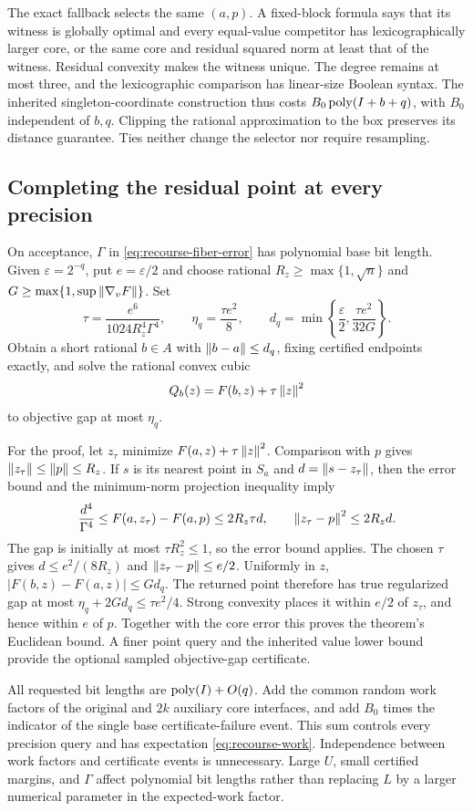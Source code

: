 The exact fallback selects the same $(a,p)$. A fixed-block formula
says that its witness is globally optimal and every equal-value
competitor has lexicographically larger core, or the same core and
residual squared norm at least that of the witness. Residual convexity
makes the witness unique. The degree remains at most three, and the
lexicographic comparison has linear-size Boolean syntax. The inherited
singleton-coordinate construction thus costs
$B_0\operatorname{poly}(I+b+q)$, with $B_0$ independent of $b,q$. Clipping the
rational approximation to the box preserves its distance guarantee.
Ties neither change the selector nor require resampling.

\subsection{Completing the residual point at every precision}

On acceptance, $\Gamma$ in \eqref{eq:recourse-fiber-error} has
polynomial base bit length. Given $\varepsilon=2^{-q}$, put
$e=\varepsilon/2$ and choose rational
$R_z\ge\max\{1,\sqrt n\}$ and
$G\ge\max\{1,\sup\left\lVert\nabla_vF\right\rVert\}$. Set
\[
 \tau=\frac{e^6}{1024R_z^4\Gamma^4},\qquad
 \eta_q=\frac{\tau e^2}{8},\qquad
 d_q=\min\left\{\frac\varepsilon2,\frac{\tau e^2}{32G}\right\}.
\]
Obtain a short rational $b\in A$ with $\left\lVert b-a\right\rVert\le d_q$, fixing
certified endpoints exactly, and solve the rational convex cubic
\[
 Q_b(z)=F(b,z)+\tau\left\lVert z\right\rVert^2
\]
to objective gap at most $\eta_q$.

For the proof, let $z_\tau$ minimize
$F(a,z)+\tau\left\lVert z\right\rVert^2$. Comparison with $p$ gives
$\left\lVert z_\tau\right\rVert\le\left\lVert p\right\rVert\le R_z$. If $s$ is its nearest point in
$S_a$ and $d=\left\lVert s-z_\tau\right\rVert$, then the error bound and the
minimum-norm projection inequality imply
\[
 \frac{d^4}{\Gamma^4}
 \le F(a,z_\tau)-F(a,p)\le2R_z\tau d,
 \qquad \left\lVert z_\tau-p\right\rVert^2\le2R_zd.
\]
The gap is initially at most $\tau R_z^2\le1$, so the error bound
applies. The chosen $\tau$ gives
$d\le e^2/(8R_z)$ and $\left\lVert z_\tau-p\right\rVert\le e/2$.
Uniformly in $z$, $|F(b,z)-F(a,z)|\le Gd_q$. The returned point
therefore has true regularized gap at most
$\eta_q+2Gd_q\le\tau e^2/4$. Strong convexity places it within
$e/2$ of $z_\tau$, and hence within $e$ of $p$. Together with the
core error this proves the theorem's Euclidean bound. A finer point
query and the inherited value lower bound provide the optional sampled
objective-gap certificate.

All requested bit lengths are $\operatorname{poly}(I)+O(q)$. Add the common random
work factors of the original and $2k$ auxiliary core interfaces, and
add $B_0$ times the indicator of the single base certificate-failure
event. This sum controls every precision query and has expectation
\eqref{eq:recourse-work}. Independence between work factors and
certificate events is unnecessary. Large $U$, small certified margins,
and $\Gamma$ affect polynomial bit lengths rather than replacing $L$
by a larger numerical parameter in the expected-work factor.

